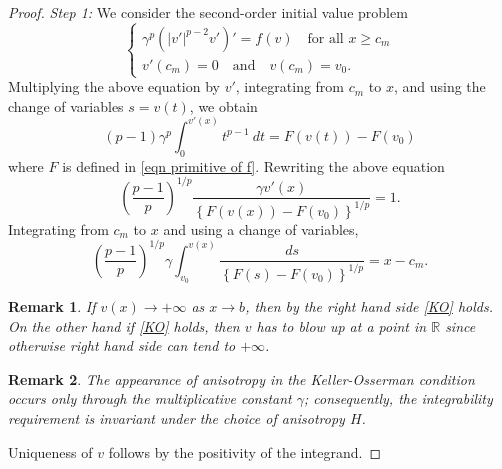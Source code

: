 \documentclass[11pt]{amsart}
\newtheorem{remark}{Remark}
\newcommand{\R}{\mathbb{R}}
\numberwithin{equation}{section}
\begin{document}
\begin{proof}
    \textit{Step 1:} We consider the second-order initial value problem
\begin{equation}\label{Ode1}
 \begin{cases}
     \gamma^{p}\left(|v'|^{p-2}v'\right)'=f(v)\quad \text{for all } x\geq c_{m}\\
     v'(c_{m})=0 \quad \text{and} \quad v(c_{m})=v_{0}.
 \end{cases}
 \end{equation}
 Multiplying the above equation by $v'$, integrating from $c_{m}$ to $x$, and using the change of variables $s=v(t)$, we obtain 
 \begin{equation*}
     (p-1)\gamma^{p}\int_{0}^{v'(x)}t^{p-1}\ dt=F\left(v(t)\right)-F(v_{0})
 \end{equation*}
 where $F$ is defined in \eqref{eqn primitive of f}.
Rewriting the above equation
 \begin{equation}\label{eqn quotient}
     \left(\frac{p-1}{p}\right)^{1/p}\frac{\gamma v'(x)}{\left\{F\left(v(x)\right)-F(v_{0})\right\}^{1/p}}=1.
 \end{equation}
 Integrating from $c_{m}$ to $x$ and using a change of variables,
 \begin{equation*}
     \left(\frac{p-1}{p}\right)^{1/p}\gamma \int_{v_{0}}^{v(x)}\frac{ds}{\left\{F(s)-F(v_{0})\right\}^{1/p}}=x-c_{m}.
 \end{equation*}
 \begin{remark}
     If $v(x)\to +\infty$ as $x\to b$, then by the right hand side \ref{KO} holds. On the other hand if \ref{KO} holds, then $v$ has to blow up at a point in $\R$ since otherwise right hand side can tend to $+\infty$.
 \end{remark}
  \begin{remark}\label{remark 1}
     The appearance of anisotropy in the Keller-Osserman condition occurs only through the multiplicative constant $\gamma$; consequently, the integrability requirement is invariant under the choice of anisotropy $H$.
 \end{remark}
Uniqueness of $v$ follows by the positivity of the integrand. %


\end{proof}
\end{document}

